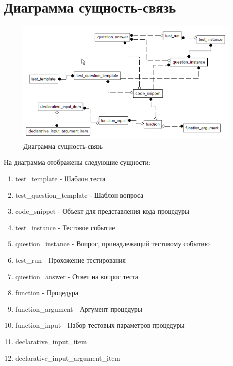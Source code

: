 \documentclass{article}
\begin{document}
\section{Диаграмма сущность-связь}
\begin{figure}[H]
    \includegraphics[width=\textwidth, center]{conceptual.png}
    \caption{Диаграмма сущность-связь}
\end{figure}
На диаграмма отображены следующие сущности:
\begin{enumerate}
    \item test\_template - Шаблон теста
    \item test\_question\_template - Шаблон вопроса
    \item code\_snippet - Объект для представления кода процедуры
    \item test\_instance - Тестовое событие
    \item question\_instance - Вопрос, принадлежащий тестовому
    событию
    \item test\_run - Прохожение тестирования
    \item question\_answer - Ответ на вопрос теста
    \item function - Процедура
    \item function\_argument - Аргумент процедуры
    \item function\_input - Набор тестовых параметров процедуры
    \item declarative\_input\_item
    \item declarative\_input\_argument\_item
\end{enumerate}
\end{document}

